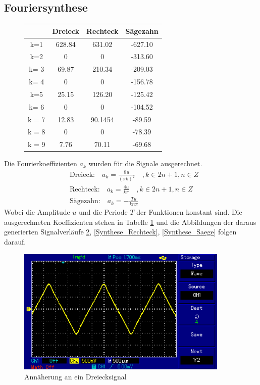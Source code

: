 \subsection{Fouriersynthese}
\begin{figure}[h!]
	\centering
	\begin{tabular}{c|ccc}
		& Dreieck & Rechteck & Sägezahn \\
		\hline
		k=1 & 628.84    & 631.02  & -627.10  \\
		k=2 & 0    & 0  & -313.60  \\
		k= 3 & 69.87  & 210.34  & -209.03  \\
		k= 4 & 0  & 0  & -156.78  \\
		k=5 & 25.15  & 126.20  & -125.42   \\
		k= 6 & 0  & 0  & -104.52  \\
		k = 7 & 12.83  &  90.1454 &  -89.59  \\
		k = 8 & 0 &  0 &  -78.39 \\
		k = 9 & 7.76 &  70.11 &  -69.68 \\
	\end{tabular}
	\label{tab:Koeffizienten}
\end{figure}
Die Fourierkoeffizienten $a_k$ wurden für die Signale ausgerechnet.
\begin{align}
&\text{Dreieck:} \quad  a_k = \frac{8u}{(\pi k)^2}  \quad , k \in 2n + 1, n \in Z  \\
&\text{Rechteck:} \quad  a_k = \frac{4u}{k \pi} \quad , k \in 2n + 1, n \in Z \\
&\text{Sägezahn:} \quad a_k = - \frac{Tu}{kn \pi}
\end{align}
Wobei die Amplitude $u$ und die Periode $T$ der Funktionen konstant sind. Die ausgerechneten Koeffizienten stehen in Tabelle \ref{tab:Koeffizienten} und die Abbildungen der daraus generierten Signalverläufe \ref{Synthese_Dreieck}, \ref{Synthese_Rechteck}, \ref{Synthese_Saege} folgen darauf.



\begin{figure}[h!]
	\centering
	\includegraphics[width=0.9\textwidth]{Synthese_Dreieck.png}
	\caption{Annäherung an ein Dreiecksignal}
	\label{Synthese_Dreieck}
\end{figure}


